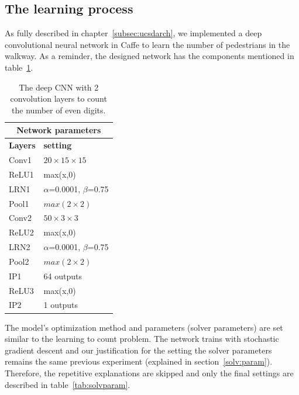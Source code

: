 \subsection{The learning process}

As fully described in chapter~\ref{subsec:ucsdarch}, we implemented a deep convolutional neural network in Caffe to learn the number of pedestrians in the walkway. As a reminder, the designed network has the components mentioned in table~\ref{tab:ucsdnet}.  

\begin{table}[H]
	\centering
			\caption{The deep CNN with 2 convolution layers to count the number of even digits.}
	\begin{tabular}{ |p{2cm}|p{2cm}| }
	\hline 
	\multicolumn{2}{|c|}{\textbf{Network parameters}} \\
	\hline
	\hline
	\textbf{Layers} & \textbf{setting }\\
	\hline
	Conv1 & $20\times15\times15$\\
	\hline
	ReLU1 & max(x,0)  \\
	\hline
	LRN1 & $\alpha$=0.0001, $\beta$=0.75\\
	\hline
	Pool1    & $max(2\times2)$ \\
	\hline
	Conv2 & $50\times3\times3$\\
	\hline
	ReLU2 & max(x,0)  \\
	\hline
	LRN2 & $\alpha$=0.0001, $\beta$=0.75\\
	\hline
	Pool2    & $max(2\times2)$ \\
	\hline
	IP1 & 64 outputs \\
	\hline
	ReLU3 & max(x,0)  \\
	\hline
	IP2 & 1 outputs \\
	\hline
	\end{tabular}
		\label{tab:ucsdnet}
\end{table}

The model's optimization method and parameters (solver parameters) are set similar to the learning to count problem. The network trains with stochastic gradient descent and our justification for the setting the solver parameters remains the same previous experiment (explained in section~\ref{solv:param}). Therefore, the repetitive explanations are skipped and only the final settings are described in table~\ref{tab:solvparam}.

